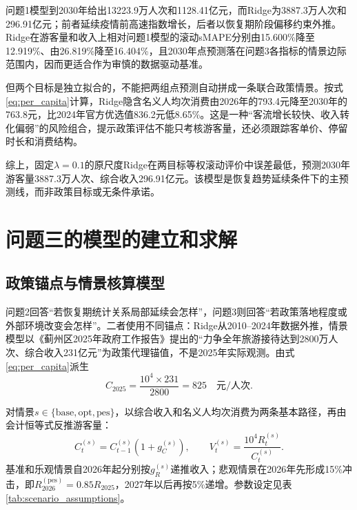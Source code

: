 \documentclass[withoutpreface,bwprint]{cumcmthesis}
\begin{document}
问题1模型到2030年给出13223.9万人次和1128.41亿元，而Ridge为3887.3万人次和296.91亿元；前者延续疫情前高速指数增长，后者以恢复期阶段偏移约束外推。Ridge在游客量和收入上相对问题1模型的滚动sMAPE分别由15.600\%降至12.919\%、由26.819\%降至16.404\%，且2030年点预测落在问题3各指标的情景边际范围内，因而更适合作为审慎的数据驱动基准。

但两个目标是独立拟合的，不能把两组点预测自动拼成一条联合政策情景。按式\eqref{eq:per_capita}计算，Ridge隐含名义人均次消费由2026年的793.4元降至2030年的763.8元，比2024年官方优选值836.2元低8.65\%。这是一种“客流增长较快、收入转化偏弱”的风险组合，提示政策评估不能只考核游客量，还必须跟踪客单价、停留时长和消费结构。

综上，固定$\lambda=0.1$的原尺度Ridge在两目标等权滚动评价中误差最低，预测2030年游客量3887.3万人次、综合收入296.91亿元。该模型是恢复趋势延续条件下的主预测线，而非政策目标或无条件承诺。


\section{问题三的模型的建立和求解}

\subsection{政策锚点与情景核算模型}

问题2回答“若恢复期统计关系局部延续会怎样”，问题3则回答“若政策落地程度或外部环境改变会怎样”。二者使用不同锚点：Ridge从2010--2024年数据外推，情景模型以《蓟州区2025年政府工作报告》提出的“力争全年旅游接待达到2800万人次、综合收入231亿元”为政策代理锚值\cite{jizhou2025report}，不是2025年实际观测。由式\eqref{eq:per_capita}派生
\begin{equation}
C_{2025}=\frac{10^4\times231}{2800}=825\quad\text{元/人次}.
\label{eq:anchor_consumption}
\end{equation}

对情景$s\in\{\mathrm{base,opt,pes}\}$，以综合收入和名义人均次消费为两条基本路径，再由会计恒等式反推游客量：
\begin{equation}
C_t^{(s)}=C_{t-1}^{(s)}\left(1+g_C^{(s)}\right),
\qquad
V_t^{(s)}=\frac{10^4R_t^{(s)}}{C_t^{(s)}}.
\label{eq:scenario_identity}
\end{equation}
基准和乐观情景自2026年起分别按$g_R^{(s)}$递推收入；悲观情景在2026年先形成15\%冲击，即$R_{2026}^{(\mathrm{pes})}=0.85R_{2025}$，2027年以后再按5\%递增。参数设定见表\ref{tab:scenario_assumptions}。
\end{document}
